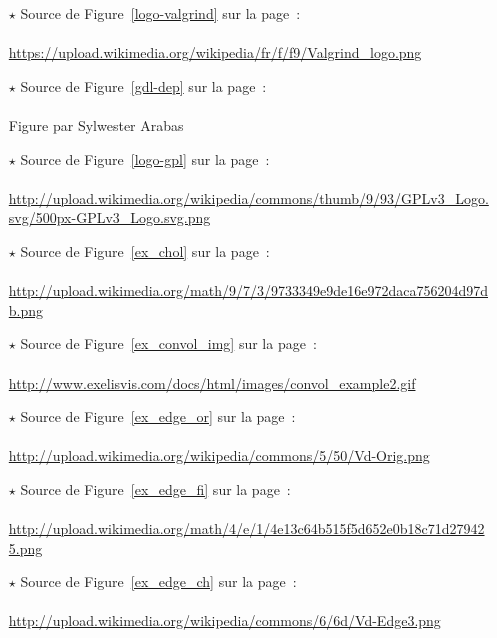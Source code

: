 \begin{itemize}
	\item[$\star$]Source de Figure~\ref{logo-valgrind} sur la page~\pageref{logo-valgrind}:\\
					\\ %
					\url{https://upload.wikimedia.org/wikipedia/fr/f/f9/Valgrind_logo.png}
	\item[$\star$]Source de Figure~\ref{gdl-dep} sur la page~\pageref{gdl-dep}:\\
					\\ %
					Figure par Sylwester Arabas	
	\item[$\star$]Source de Figure~\ref{logo-gpl} sur la page~\pageref{logo-gpl}:\\
					\\ %
					\url{http://upload.wikimedia.org/wikipedia/commons/thumb/9/93/GPLv3_Logo.svg/500px-GPLv3_Logo.svg.png}
	\item[$\star$]Source de Figure~\ref{ex_chol} sur la page~\pageref{ex_chol}:\\
					\\ %
					\url{http://upload.wikimedia.org/math/9/7/3/9733349e9de16e972daca756204d97db.png}
	\item[$\star$]Source de Figure~\ref{ex_convol_img} sur la page~\pageref{ex_convol_img}:\\
					\\ %
					\url{http://www.exelisvis.com/docs/html/images/convol_example2.gif}
	\item[$\star$]Source de Figure~\ref{ex_edge_or} sur la page~\pageref{ex_edge_or}:\\
					\\ %
					\url{http://upload.wikimedia.org/wikipedia/commons/5/50/Vd-Orig.png}
	\item[$\star$]Source de Figure~\ref{ex_edge_fi} sur la page~\pageref{ex_edge_fi}:\\
					\\ %
					\url{http://upload.wikimedia.org/math/4/e/1/4e13c64b515f5d652e0b18c71d279425.png}
	\item[$\star$]Source de Figure~\ref{ex_edge_ch} sur la page~\pageref{ex_edge_ch}:\\
					\\ %
					\url{http://upload.wikimedia.org/wikipedia/commons/6/6d/Vd-Edge3.png}
\end{itemize}